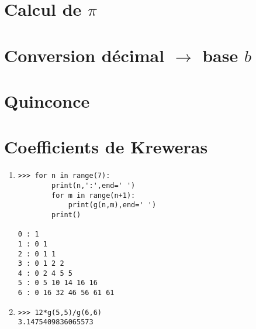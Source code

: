 \documentclass[11pt,a4paper]{article}
\begin{document}

\section{Calcul de $\pi$}


\section{Conversion décimal $\rightarrow$ base $b$}


\section{Quinconce}


\section{Coefficients de Kreweras}
%

\begin{minipage}[t]{7cm}
\begin{enumerate}
\item 
\begin{Verbatim}
>>> for n in range(7):
        print(n,':',end=' ')
        for m in range(n+1):
            print(g(n,m),end=' ')
        print()

0 : 1 
1 : 0 1 
2 : 0 1 1 
3 : 0 1 2 2 
4 : 0 2 4 5 5 
5 : 0 5 10 14 16 16 
6 : 0 16 32 46 56 61 61 
\end{Verbatim}
\end{enumerate}
\end{minipage}
\hfill
\begin{minipage}[t]{7cm}
\begin{enumerate}\setcounter{enumi}{1}
\item  
\begin{Verbatim}
>>> 12*g(5,5)/g(6,6)
3.1475409836065573

\end{Verbatim}
\end{enumerate}
\end{minipage}
\end{document}
